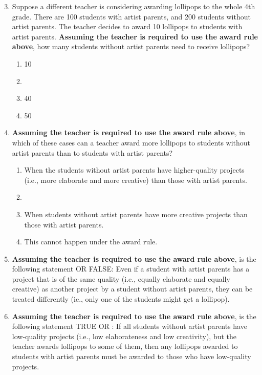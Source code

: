 \documentclass{article}
\newcommand{\correct}[1]{{\color{red}{#1}}}
\newcommand{\correct}[1]{{\color{red}{#1}}}
\begin{document}
\begin{enumerate}
    \setcounter{enumi}{2}
    \item Suppose a different teacher is considering awarding lollipops to the whole 4th grade. There are 100 students with artist parents, and 200 students without artist parents. The teacher decides to award 10 lollipops to students with artist parents. \textbf{Assuming the teacher is required to use the award rule above}, how many students without artist parents need to receive lollipops?
    \begin{enumerate}
        \item 10
        \item \correct{20}
        \item 40
        \item 50
    \end{enumerate}
    \item \textbf{Assuming the teacher is required to use the award rule above}, in which of these cases can a teacher award more lollipops to students without artist parents than to students with artist parents?
    \begin{enumerate}
        \item When the students without artist parents have higher-quality projects (i.e., more elaborate and more creative) than those with artist parents.
        \item \correct{When there are more students without artist parents than those with artist parents.}
        \item When students without artist parents have more creative projects than those with artist parents.
        \item This cannot happen under the award rule.
    \end{enumerate}
    \item \textbf{Assuming the teacher is required to use the award rule above}, is the following statement \correct{TRUE} OR FALSE: Even if a student with artist parents has a project that is of the same quality (i.e., equally elaborate and equally creative) as another project by a student without artist parents, they can be treated differently (ie., only one of the students might get a lollipop).
    \item \textbf{Assuming the teacher is required to use the award rule above}, is the following statement TRUE OR \correct{FALSE}: If all students without artist parents have low-quality projects (i.e., low elaborateness and low creativity), but the teacher awards lollipops to some of them, then any lollipops awarded to students with artist parents must be awarded to those who have low-quality projects.

\end{enumerate}
\end{document}
